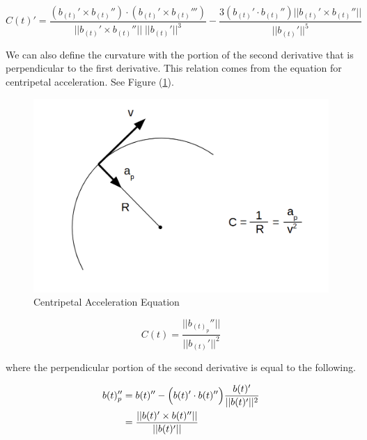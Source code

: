 \documentclass{article}
\begin{document}
\begin{equation}
    C(t)' = \frac{(b_{(t)}' \times b_{(t)}'') \cdot (b_{(t)}' \times b_{(t)}''')}{||b_{(t)}' \times b_{(t)}''||\;||b_{(t)}'||^3} - \frac{3(b_{(t)}' \cdot b_{(t)}'') || b_{(t)}' \times b_{(t)}''||}{||b_{(t)}'||^5}
\end{equation}


We can also define the curvature with the portion of the second derivative that is perpendicular to the first derivative. This relation comes from the equation for centripetal acceleration. See Figure (\ref{Fig:Centripetal_Acceleration}).


\begin{figure}[h]
\begin{center}
\includegraphics[scale=.23]{Centripetal_Acceleration.png}
\end{center}
\caption{Centripetal Acceleration Equation}
\label{Fig:Centripetal_Acceleration}
\end{figure}

\begin{equation} \label{eq:curvature using centripetal}
    C(t) = \frac{||b_{(t)}_p''||}{||b_{(t)}'||^2}
\end{equation}

where the perpendicular portion of the second derivative is equal to the following.

\begin{equation}
\begin{aligned}
    b(t)_p'' &= b(t)'' -  \Bigl(b(t)' \cdot b(t)''\Bigl) \frac{b(t)'}{||b(t)'||^2} \\
    &= \frac{||b(t)' \times b(t)''||} {||b(t)'||}
\end{aligned}
\end{equation}
\end{document}

